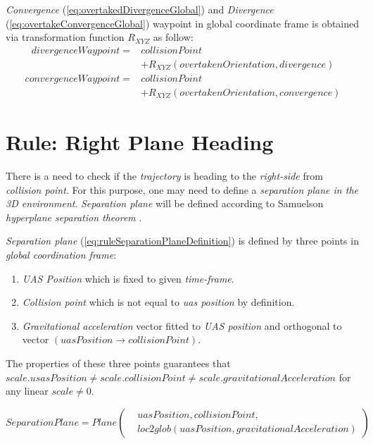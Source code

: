 \emph{Convergence} (\ref{eq:overtakedDivergenceGlobal}) and \emph{Divergence} (\ref{eq:overtakeConvergenceGlobal}) waypoint in global coordinate frame is obtained via transformation function $R_{XYZ}$ as follow:
\begin{equation}\label{eq:overtakedDivergenceGlobal}
    \begin{split}
        divergenceWaypoint = & collisionPoint \\ &+ R_{XYZ}(overtakenOrientation,divergence)    
    \end{split}
\end{equation}
\begin{equation}\label{eq:overtakeConvergenceGlobal}
    \begin{split}
        convergenceWaypoint =  & collisionPoint \\ &+ R_{XYZ}(overtakenOrientation,convergence) 
    \end{split}
\end{equation}


\section{Rule: Right Plane Heading}\label{sec:ruleRightPlaneHeading}
\noindent There is a need to check if the \emph{trajectory} is heading to the \emph{right-side} from \emph{collision point}. For this purpose, one may need to define a \emph{separation plane in the 3D environment}. \emph{Separation plane} will be defined according to Samuelson \emph{hyperplane separation theorem} \cite{samelson1958partition}.

\emph{Separation plane} (\ref{eq:ruleSeparationPlaneDefinition}) is defined by three points in \emph{global coordination frame}:
\begin{enumerate}
    \item \emph{UAS Position} which is fixed to given \emph{time-frame}.
    \item \emph{Collision point} which is not equal to \emph{uas position} by definition.
    \item \emph{Gravitational acceleration} vector fitted to \emph{UAS position} and orthogonal to vector $(uasPosition\to collisionPoint)$.
\end{enumerate}
The properties of these three points guarantees that 
$scale.usasPosition\neq scale.collisionPoint \neq scale.gravitationalAcceleration$ for any linear $scale\neq0$.

\begin{equation}\label{eq:ruleSeparationPlaneDefinition}
    SeparationPlane=Plane\left(\begin{aligned}&uasPosition,collisionPoint,\\&loc2glob(uasPosition,gravitationalAcceleration)\end{aligned}\right)
\end{equation}

